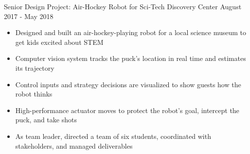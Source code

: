 Senior Design Project: Air-Hockey Robot for Sci-Tech Discovery Center
\hfill
August 2017 - May 2018
\begin{itemize}
    \item Designed and built an air-hockey-playing robot for a local science museum to get kids excited about STEM
    \item Computer vision system tracks the puck's location in real time and estimates its trajectory
    \item Control inputs and strategy decisions are visualized to show guests how the robot thinks 
    \item High-performance actuator moves to protect the robot's goal, intercept the puck, and take shots
    \item As team leader, directed a team of six students, coordinated with stakeholders, and managed deliverables
\end{itemize}

